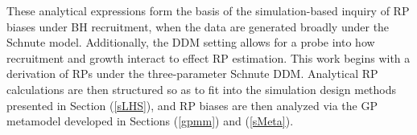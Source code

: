 %
These analytical expressions form the basis of the simulation-based inquiry of
RP biases under BH recruitment, when the data are generated broadly under the 
Schnute model. Additionally, the DDM setting allows for a probe into how recruitment and 
growth interact to effect RP estimation. 
This work begins with a derivation of RPs under the three-parameter Schnute 
DDM. Analytical RP calculations are then structured so as to fit into the 
simulation design methods presented in Section (\ref{sLHS}), and RP biases are 
then analyzed via the GP metamodel developed in Sections (\ref{gpmm}) and (\ref{sMeta}).


